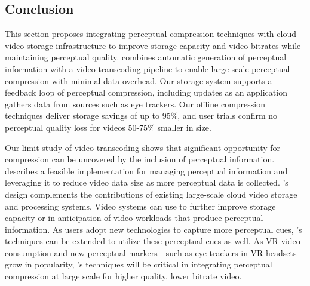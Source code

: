 \subsection{Conclusion}
This section proposes integrating perceptual compression techniques with cloud video storage infrastructure to improve storage capacity and video bitrates while maintaining perceptual quality.
\name combines automatic generation of perceptual information with a video transcoding pipeline to enable large-scale perceptual compression with minimal data overhead.
Our storage system supports a feedback loop of perceptual compression, including updates as an application gathers data from sources such as eye trackers.
Our offline compression techniques deliver storage savings of up to 95\%, and user trials confirm no perceptual quality loss for \name videos 50-75\% smaller in size.

Our limit study of video transcoding shows that significant opportunity for compression can be uncovered by the inclusion of perceptual information.
\name describes a feasible implementation for managing perceptual information and leveraging it to reduce video data size as more perceptual data is collected.
\name's design complements the contributions of existing large-scale cloud video storage and processing systems.
Video systems can use \name to further improve storage capacity or in anticipation of video workloads that produce perceptual information.
As users adopt new technologies to capture more perceptual cues, \name's techniques can be extended to utilize these perceptual cues as well.
As VR video consumption and new perceptual markers---such as eye trackers in VR headsets---grow in popularity, \name's techniques will be critical in integrating perceptual compression at large scale for higher quality, lower bitrate video. %
